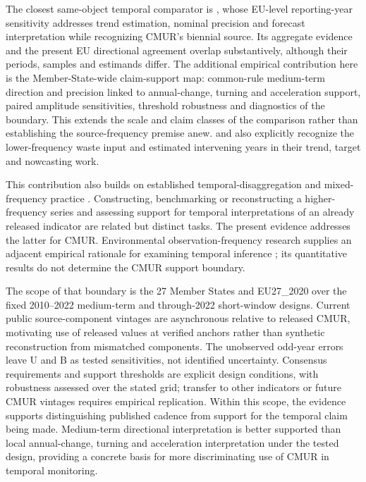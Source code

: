 The closest same-object temporal comparator is \textcite{Haider2026}, whose EU-level reporting-year sensitivity addresses trend estimation, nominal precision and forecast interpretation while recognizing CMUR's biennial source. Its aggregate evidence and the present EU directional agreement overlap substantively, although their periods, samples and estimands differ. The additional empirical contribution here is the Member-State-wide claim-support map: common-rule medium-term direction and precision linked to annual-change, turning and acceleration support, paired amplitude sensitivities, threshold robustness and diagnostics of the boundary. This extends the scale and claim classes of the comparison rather than establishing the source-frequency premise anew. \textcite{Christis2023} and \textcite{Nuss2024Nowcasting} also explicitly recognize the lower-frequency waste input and estimated intervening years in their trend, target and nowcasting work.

This contribution also builds on established temporal-disaggregation and mixed-frequency practice \parencite{ESS2018,Quilis2018,Mattera2023}. Constructing, benchmarking or reconstructing a higher-frequency series and assessing support for temporal interpretations of an already released indicator are related but distinct tasks. The present evidence addresses the latter for CMUR. Environmental observation-frequency research supplies an adjacent empirical rationale for examining temporal inference \parencite{CortesGuzman2026}; its quantitative results do not determine the CMUR support boundary.

The scope of that boundary is the 27 Member States and EU27\_2020 over the fixed 2010--2022 medium-term and through-2022 short-window designs. Current public source-component vintages are asynchronous relative to released CMUR, motivating use of released values at verified anchors rather than synthetic reconstruction from mismatched components. The unobserved odd-year errors leave U and B as tested sensitivities, not identified uncertainty. Consensus requirements and support thresholds are explicit design conditions, with robustness assessed over the stated grid; transfer to other indicators or future CMUR vintages requires empirical replication. Within this scope, the evidence supports distinguishing published cadence from support for the temporal claim being made. Medium-term directional interpretation is better supported than local annual-change, turning and acceleration interpretation under the tested design, providing a concrete basis for more discriminating use of CMUR in temporal monitoring.
